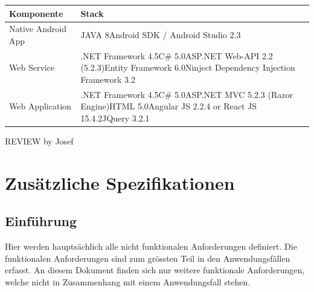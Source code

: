 \documentclass[a4paper,10pt,xetex]{article}
\begin{document}
\begin{longtable}[]{@{}ll@{}}
\toprule
\begin{minipage}[b]{0.14\columnwidth}\raggedright\strut
\textbf{Komponente}\strut
\end{minipage} & \begin{minipage}[b]{0.80\columnwidth}\raggedright\strut
\textbf{Stack}\strut
\end{minipage}\tabularnewline
\midrule
\endhead
\begin{minipage}[t]{0.14\columnwidth}\raggedright\strut
Native Android App\strut
\end{minipage} & \begin{minipage}[t]{0.80\columnwidth}\raggedright\strut
JAVA 8Android SDK / Android Studio 2.3\strut
\end{minipage}\tabularnewline
\begin{minipage}[t]{0.14\columnwidth}\raggedright\strut
Web Service\strut
\end{minipage} & \begin{minipage}[t]{0.80\columnwidth}\raggedright\strut
.NET Framework 4.5C\# 5.0ASP.NET Web-API 2.2 (5.2.3)Entity Framework
6.0Ninject Dependency Injection Framework 3.2\strut
\end{minipage}\tabularnewline
\begin{minipage}[t]{0.14\columnwidth}\raggedright\strut
Web Application\strut
\end{minipage} & \begin{minipage}[t]{0.80\columnwidth}\raggedright\strut
.NET Framework 4.5C\# 5.0ASP.NET MVC 5.2.3 (Razor Engine)HTML 5.0Angular
JS 2.2.4 or React JS 15.4.2JQuery 3.2.1\strut
\end{minipage}\tabularnewline
\bottomrule
\end{longtable}

REVIEW by Josef

\section{Zusätzliche
Spezifikationen}\label{zusuxe4tzliche-spezifikationen}

\subsection{Einführung}\label{einfuxfchrung}

Hier werden hauptsächlich alle nicht funktionalen Anforderungen
definiert. Die funktionalen Anforderungen sind zum grössten Teil in den
Anwendungsfällen erfasst. An diesem Dokument finden sich nur weitere
funktionale Anforderungen, welche nicht in Zusammenhang mit einem
Anwendungsfall stehen.
\end{document}
